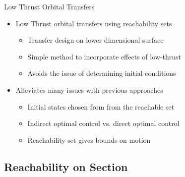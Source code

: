 \begin{frame}{Low Thrust Orbital Transfers} %
    \begin{itemize}
        \item Low Thrust orbital transfers using reachability sets 
        \begin{itemize}
            \item Transfer design on lower dimensional \Poincare surface
            \item Simple method to incorporate effects of low-thrust 
            \item Avoids the issue of determining initial conditions
        \end{itemize}
    \pause
        \item Alleviates many issues with previous approaches
        \begin{itemize}
            \item Initial states chosen from from the reachable set
            \item Indirect optimal control vs. direct optimal control
            \item Reachability set gives bounds on motion
        \end{itemize}    
    \end{itemize}

\end{frame} %

\subsection{Reachability on \Poincare Section}

